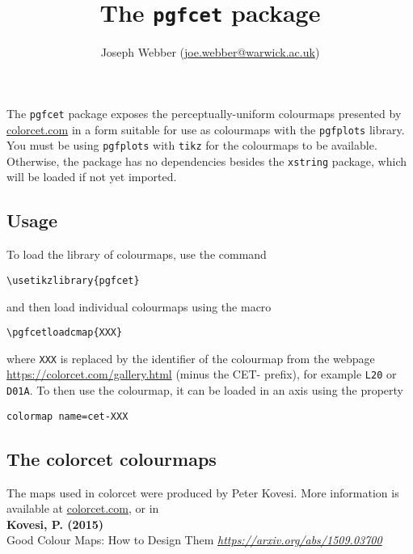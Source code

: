 \documentclass{article}
\begin{document}
    \title{The \texttt{pgfcet} package}
    \author{Joseph Webber (\href{mailto:joe.webber@warwick.ac.uk}{joe.webber@warwick.ac.uk})}
    \maketitle

    The \texttt{pgfcet} package exposes the perceptually-uniform colourmaps presented by \href{https://colorcet.com}{colorcet.com} in a form suitable for use as colourmaps with the \texttt{pgfplots} library. You must be using \texttt{pgfplots} with \texttt{tikz} for the colourmaps to be available. Otherwise, the package has no dependencies besides the \texttt{xstring} package, which will be loaded if not yet imported.

    \subsection*{Usage}
    To load the library of colourmaps, use the command
    \begin{lstlisting}
\usetikzlibrary{pgfcet}
    \end{lstlisting}
    and then load individual colourmaps using the macro
    \begin{lstlisting}
\pgfcetloadcmap{XXX}
    \end{lstlisting}
    where \texttt{XXX} is replaced by the identifier of the colourmap from the webpage \href{https://colorcet.com/gallery.html}{https://colorcet.com/gallery.html} (minus the CET- prefix), for example \texttt{L20} or \texttt{D01A}. To then use the colourmap, it can be loaded in an axis using the property
    \begin{lstlisting}
colormap name=cet-XXX
    \end{lstlisting}

    \subsection*{The colorcet colourmaps}
    The maps used in colorcet were produced by Peter Kovesi. More information is available at \href{https://colorcet.com}{colorcet.com}, or in\\

    {\color{gray}
    \noindent\textbf{Kovesi, P. (2015)}\\ Good Colour Maps: How to Design Them \textit{\href{arXiv:1509.03700 [cs.GR]}{https://arxiv.org/abs/1509.03700}}
    }
\end{document}
